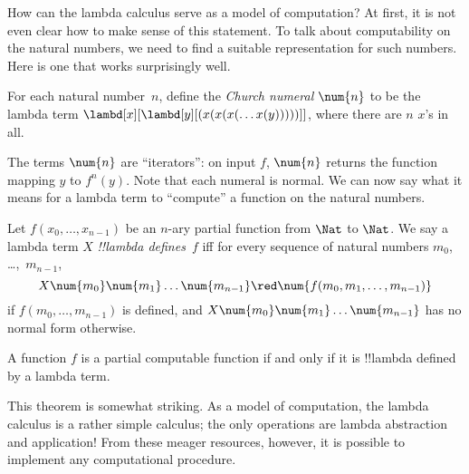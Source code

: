 \documentclass[../../../include/open-logic-section]{subfiles}
\begin{document}

How can the lambda calculus serve as a model of computation? At first,
it is not even clear how to make sense of this statement. To talk
about computability on the natural numbers, we need to find a suitable
representation for such numbers. Here is one that works surprisingly
well.

\begin{defn}
For each natural number~$n$, define the \emph{Church numeral} $\num{n}$ to be
the lambda term $\lambd[x][\lambd[y][(x(x(x(\dots x(y)))))]]$, where
there are $n$ $x$'s in all.
\end{defn}

The terms $\num{n}$ are ``iterators'': on input $f$, $\num{n}$ returns
the function mapping $y$ to $f^n(y)$. Note that each numeral is
normal. We can now say what it means for a lambda term to ``compute''
a function on the natural numbers.

\begin{defn}
Let $f(x_0, \dots, x_{n-1})$ be an $n$-ary partial function from $\Nat$
to $\Nat$. We say a lambda term $X$ \emph{!!{lambda define}s}~$f$ iff for every
sequence of natural numbers $m_0$, \dots,~$m_{n-1}$,
\[
X \num{m_0} \num{m_1} \dots \num{m_{n-1}} \red \num{f(m_0, m_1, \dots,
  m_{n-1})}
\]
if $f(m_0, \dots, m_{n-1})$ is defined, and $X \num{m_0} \num{m_1}
\dots \num{m_{n-1}}$ has no normal form otherwise.
\end{defn}

\begin{thm}
A function $f$ is a partial computable function if and only if it is
!!{lambda defined} by a lambda term.
\end{thm}

\begin{explain}
This theorem is somewhat striking. As a model of computation, the
lambda calculus is a rather simple calculus; the only operations are
lambda abstraction and application!{} From these meager resources,
however, it is possible to implement any computational procedure.
\end{explain}
\end{document}
